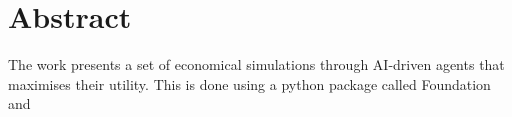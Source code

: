 \documentclass[12pt,a4paper,openright,twoside]{report}
\numberwithin{equation}{section}
\begin{document}
 




\begin{comment}

\begin{titlepage} 
\thispagestyle{empty}                   %
\topmargin=6.5cm                        %
\raggedleft                             %
\large                                  %
\em                                     %
Questa è la \textsc{Dedica}:\\
ognuno può scrivere quello che vuole, \\
anche nulla \ldots                   
\newpage                               
\end{titlepage}
       
\end{comment}



\chapter*{Abstract}             

The work presents a set of economical simulations through AI-driven agents that maximises their utility. This is done using a python package called Foundation and

\clearpage{\pagestyle{empty}\cleardoublepage}
\tableofcontents      
\clearpage{\pagestyle{empty}\cleardoublepage}

\begingroup
\let\clearpage\relax
\listoffigures   
\listoftables  
\endgroup

\clearpage{\pagestyle{empty}\cleardoublepage}

\end{document}
